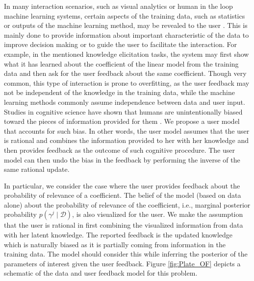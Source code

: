 \documentclass[dissertation,math,vertlayout,pdfa,colorlinks]{aaltoseries}
\newcommand{\bD}{\mathcal{D}}
\begin{document}
In many interaction scenarios, such as visual analytics or human in the loop machine learning systems, certain aspects of the training data, such as statistics or outputs of the machine learning method, may be revealed to the user  \cite{BEAMES_Endert,sacha2017you,Homayun_pairwise_UMAP,muhlbacher2013partition,Talbot2009,van2011baobabview,Kapoor2010,krause2014infuse,sarkar2015interactive,Micallef_elicitation}. This is mainly done to provide information about important characteristic of the data to improve decision making or to guide the user to facilitate the interaction. For example, in the mentioned knowledge elicitation tasks, the system may first show what it has learned about the coefficient of the linear model from the training data and then ask for the user feedback about the same coefficient. Though very common, this type of interaction is prone to overfitting, as the user feedback may not be independent of the knowledge in the training data, while the machine learning methods commonly assume independence between data and user input. Studies in cognitive science have shown that humans are unintentionally biased toward the pieces of information provided for them \cite{Tversky1974,garthwaite2005statistical}. We propose a user model that accounts for such bias. In other words, the user model assumes that the user is rational \cite{gershman2015computational} and combines the information provided to her with her knowledge and then provides feedback as the outcome of such cognitive procedure. The user model can then undo the bias in the feedback by performing the inverse of the same rational update.

In particular, we consider the case where the user provides feedback about the probability of relevance of a coefficient. %
The belief of the model (based on data alone) about the probability of relevance of the coefficient, i.e., marginal posterior probability $p(\gamma^j \mid \bD)$, is also visualized for the user. We make the assumption that the user is rational in first combining the visualized information from data with her latent knowledge. The reported feedback is the updated knowledge which is naturally biased as it is partially coming from information in the training data. The model should consider this while inferring the posterior of the parameters of interest given the user feedback. Figure \ref{fig:Plate_OF} depicts a schematic of the data and user feedback model for this problem.%
 
\end{document}
